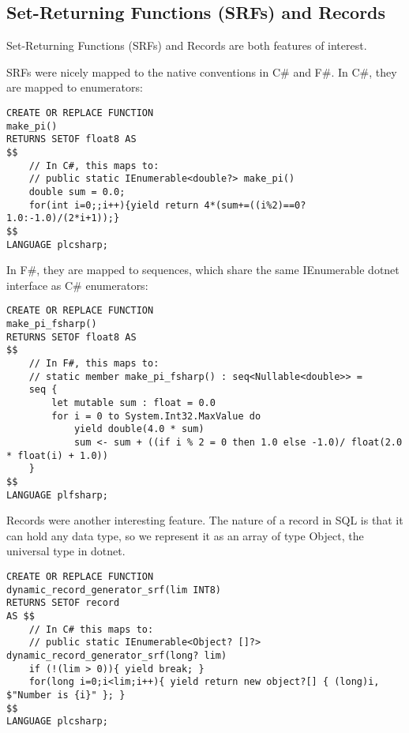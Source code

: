 \documentclass[sigconf,techreport,authorversion,nonacm]{acmart}
\begin{document}
\subsection{Set-Returning Functions (SRFs) and Records}

Set-Returning Functions (SRFs) and Records are both features of interest.

SRFs were nicely mapped to the native conventions in C\# and F\#.
In C\#, they are mapped to enumerators:

\begin{listing}[H]
\begin{verbatim}
CREATE OR REPLACE FUNCTION
make_pi()
RETURNS SETOF float8 AS
$$
    // In C#, this maps to:
    // public static IEnumerable<double?> make_pi()
    double sum = 0.0;
    for(int i=0;;i++){yield return 4*(sum+=((i%2)==0?1.0:-1.0)/(2*i+1));}
$$
LANGUAGE plcsharp;
\end{verbatim}
\end{listing}

In F\#, they are mapped to sequences, which share the same IEnumerable
dotnet interface as C\# enumerators:

\begin{listing}[H]
\begin{verbatim}
CREATE OR REPLACE FUNCTION
make_pi_fsharp()
RETURNS SETOF float8 AS
$$
    // In F#, this maps to:
    // static member make_pi_fsharp() : seq<Nullable<double>> =
    seq {
        let mutable sum : float = 0.0
        for i = 0 to System.Int32.MaxValue do
            yield double(4.0 * sum)
            sum <- sum + ((if i % 2 = 0 then 1.0 else -1.0)/ float(2.0 * float(i) + 1.0))
    }
$$
LANGUAGE plfsharp;
\end{verbatim}
\end{listing}

Records were another interesting feature.  The nature of a record
in SQL is that it can hold any data type, so we represent it as an array
of type Object, the universal type in dotnet.

\begin{listing}[H]
\begin{verbatim}
CREATE OR REPLACE FUNCTION
dynamic_record_generator_srf(lim INT8)
RETURNS SETOF record
AS $$
    // In C# this maps to:
    // public static IEnumerable<Object? []?> dynamic_record_generator_srf(long? lim)
    if (!(lim > 0)){ yield break; }
    for(long i=0;i<lim;i++){ yield return new object?[] { (long)i, $"Number is {i}" }; }
$$
LANGUAGE plcsharp;
\end{verbatim}
\end{listing}
\end{document}
